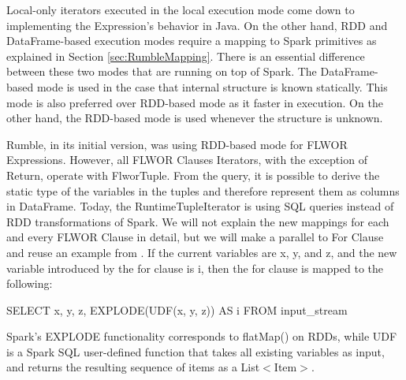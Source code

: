 Local-only iterators executed in the local execution mode come down to implementing the Expression's behavior in Java. On the other hand, RDD and DataFrame-based execution modes require a mapping to Spark primitives as explained in Section \ref{sec:RumbleMapping}. There is an essential difference between these two modes that are running on top of Spark. The DataFrame-based mode is used in the case that internal structure is known statically. This mode is also preferred over RDD-based mode as it faster in execution. On the other hand, the RDD-based mode is used whenever the structure is unknown. 

Rumble, in its initial version, was using RDD-based mode for FLWOR Expressions. However, all FLWOR Clauses Iterators, with the exception of Return, operate with FlworTuple. From the query, it is possible to derive the static type of the variables in the tuples and therefore represent them as columns in DataFrame. Today, the RuntimeTupleIterator is using SQL queries instead of RDD transformations of Spark. We will not explain the new mappings for each and every FLWOR Clause in detail, but we will make a parallel to For Clause and reuse an example from \cite{RumblePaper}. If the current variables are x, y, and z, and the new variable introduced by the for clause is i, then the for clause is mapped to the following:

SELECT x, y, z, EXPLODE(UDF(x, y, z)) AS i FROM input\_stream

Spark’s EXPLODE functionality corresponds to flatMap() on RDDs, while UDF is a Spark SQL user-defined function that takes all existing variables as input, and returns the resulting sequence of items as a List$<$Item$>$.

